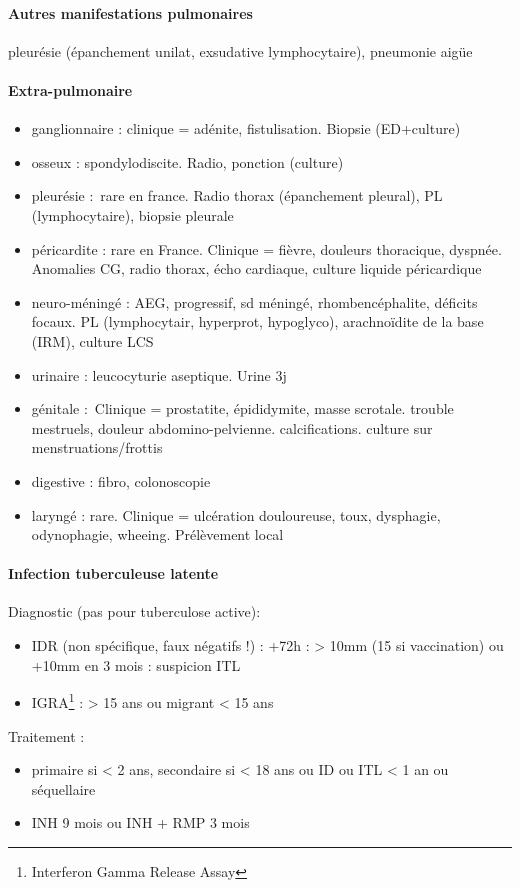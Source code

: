 \paragraph{Autres manifestations pulmonaires} pleurésie (épanchement unilat, exsudative lymphocytaire), pneumonie aigüe

\paragraph{Extra-pulmonaire}
\begin{itemize}
  \item ganglionnaire : clinique = adénite, fistulisation. Biopsie (ED+culture)
  \item osseux : spondylodiscite. Radio, ponction (culture)
  \item pleurésie : rare en france. Radio thorax (épanchement pleural), PL
    (lymphocytaire), biopsie pleurale
  \item péricardite : rare en France. Clinique = fièvre, douleurs thoracique,
    dyspnée. Anomalies CG, radio thorax, écho cardiaque, culture liquide
    péricardique
  \item neuro-méningé : AEG, progressif, sd méningé, rhombencéphalite, déficits
    focaux. PL (lymphocytair, hyperprot, hypoglyco), arachnoïdite de la base
    (IRM), culture LCS
  \item urinaire : leucocyturie aseptique. Urine 3j
  \item génitale : Clinique = \male{} prostatite, épididymite, masse scrotale. \female{}
    trouble mestruels, douleur abdomino-pelvienne. \male{} calcifications.
    \female{} culture sur menstruations/frottis
  \item digestive : fibro, colonoscopie
  \item laryngé : rare. Clinique = ulcération douloureuse, toux, dysphagie,
    odynophagie, wheeing. Prélèvement local
\end{itemize}

\paragraph{Infection tuberculeuse latente}
Diagnostic (\danger pas pour tuberculose active): 
\begin{itemize}
\item IDR (non spécifique, faux négatifs !) : +72h : \diameter > 10mm (15 si vaccination) ou +10mm en 3 mois : suspicion ITL
\item IGRA\footnote{Interferon Gamma Release Assay} : > 15 ans ou migrant  < 15 ans
\end{itemize}
Traitement : 
\begin{itemize}
\item primaire si < 2 ans, secondaire si < 18 ans ou ID ou ITL < 1 an ou séquellaire
\item INH 9 mois ou INH + RMP 3 mois
\end{itemize}

